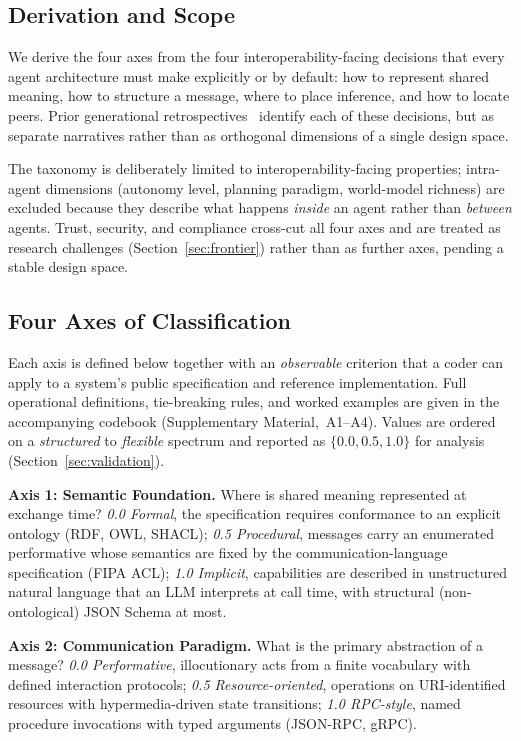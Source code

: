 \documentclass[10pt,twocolumn]{article}
\begin{document}
\subsection{Derivation and Scope}

We derive the four axes from the four interoperability-facing decisions that every agent architecture must make explicitly or by default: how to represent shared meaning, how to structure a message, where to place inference, and how to locate peers.  Prior generational retrospectives~\cite{Ciortea_2019, Hogan_2020} identify each of these decisions, but as separate narratives rather than as orthogonal dimensions of a single design space.

The taxonomy is deliberately limited to interoperability-facing properties; intra-agent dimensions (autonomy level, planning paradigm, world-model richness) are excluded because they describe what happens \emph{inside} an agent rather than \emph{between} agents.  Trust, security, and compliance cross-cut all four axes and are treated as research challenges (Section~\ref{sec:frontier}) rather than as further axes, pending a stable design space.

\subsection{Four Axes of Classification}

Each axis is defined below together with an \emph{observable} criterion that a coder can apply to a system's public specification and reference implementation.  Full operational definitions, tie-breaking rules, and worked examples are given in the accompanying codebook (Supplementary Material, \textsection\,A1--A4).  Values are ordered on a \emph{structured} to \emph{flexible} spectrum and reported as $\{0.0, 0.5, 1.0\}$ for analysis (Section~\ref{sec:validation}).

\textbf{Axis 1: Semantic Foundation.}  Where is shared meaning represented at exchange time?
\emph{0.0 Formal}, the specification requires conformance to an explicit ontology (RDF, OWL, SHACL);
\emph{0.5 Procedural}, messages carry an enumerated performative whose semantics are fixed by the communication-language specification (FIPA ACL);
\emph{1.0 Implicit}, capabilities are described in unstructured natural language that an LLM interprets at call time, with structural (non-ontological) JSON Schema at most.

\textbf{Axis 2: Communication Paradigm.}  What is the primary abstraction of a message?
\emph{0.0 Performative}, illocutionary acts from a finite vocabulary with defined interaction protocols;
\emph{0.5 Resource-oriented}, operations on URI-identified resources with hypermedia-driven state transitions;
\emph{1.0 RPC-style}, named procedure invocations with typed arguments (JSON-RPC, gRPC).
\end{document}
